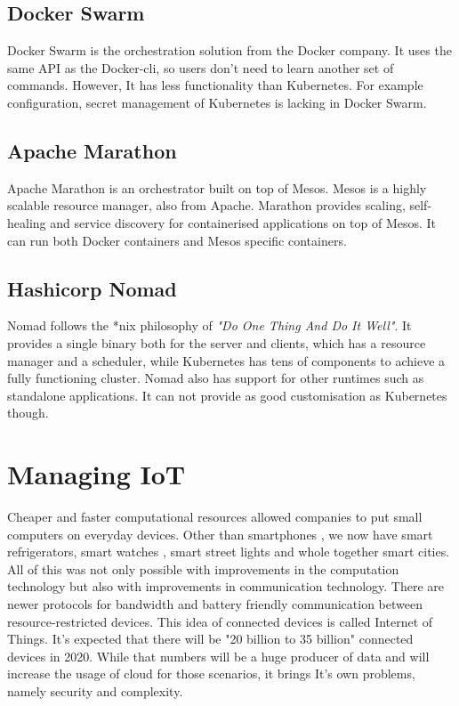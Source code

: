 \subsection*{Docker Swarm}
Docker Swarm is the orchestration solution from the Docker company. It uses the same API as the Docker-cli, so users don't need to learn another set of commands. However, It has less functionality than Kubernetes. For example configuration, secret management of Kubernetes is lacking in Docker Swarm.

\subsection*{Apache Marathon}
Apache Marathon is an orchestrator built on top of Mesos. Mesos is a highly scalable resource manager, also from Apache. Marathon provides scaling, self-healing and service discovery for containerised applications on top of Mesos. It can run both Docker containers and Mesos specific containers.

\subsection*{Hashicorp Nomad}
Nomad follows the *nix philosophy of \textit{"Do One Thing And Do It Well"}. It provides a single binary both for the server and clients, which has a resource manager and a scheduler, while Kubernetes has tens of components to achieve a fully functioning cluster. Nomad also has support for other runtimes such as standalone applications. It can not provide as good customisation as Kubernetes though.

\section{Managing IoT}
\iffalse
Cheaper and faster computational resources allowed companies to put small computers on everyday devices. Other than smartphones , we now have smart refrigerators, smart watches , smart street lights and whole together smart cities. All of this was not only possible with improvements in the computation technology but also with improvements in communication technology. There are newer protocols for bandwidth and battery friendly communication between resource-restricted devices. This idea of connected devices is called Internet of Things. It's expected that there will be "20 billion to 35 billion"\cite{unikernels-improve} connected devices in 2020. While that numbers will be a huge producer of data and will increase the usage of cloud for those scenarios, it brings It's own problems, namely security and complexity.

